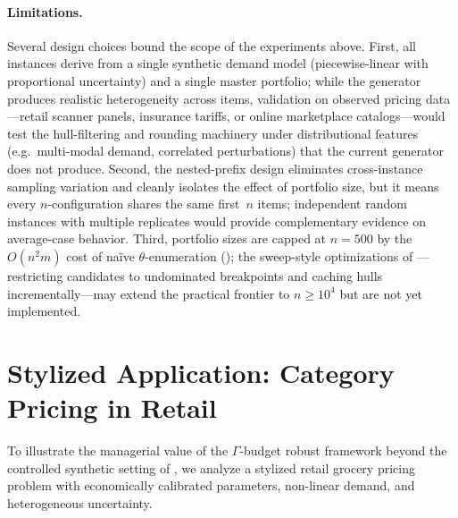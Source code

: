 \documentclass[11pt, a4paper]{article}
\theoremstyle{plain}
\theoremstyle{definition}
\theoremstyle{remark}
\begin{document}
\paragraph{Limitations.}
Several design choices bound the scope of the experiments above.
First, all instances derive from a single synthetic demand model (piecewise-linear with
proportional uncertainty) and a single master portfolio; while the generator produces
realistic heterogeneity across items, validation on observed pricing data---retail scanner
panels, insurance tariffs, or online marketplace catalogs---would test the hull-filtering
and rounding machinery under distributional features (e.g.\ multi-modal demand, correlated
perturbations) that the current generator does not produce.
Second, the nested-prefix design eliminates cross-instance sampling variation and cleanly
isolates the effect of portfolio size, but it means every $n$-configuration shares the same
first~$n$ items; independent random instances with multiple replicates would provide
complementary evidence on average-case behavior.
Third, portfolio sizes are capped at $n=500$ by the $O(n^2 m)$ cost of na\"ive
$\theta$-enumeration (); the sweep-style optimizations
of ---restricting candidates to undominated breakpoints and caching
hulls incrementally---may extend the practical frontier to $n\ge 10^4$ but
are not yet implemented.
\section{Stylized Application: Category Pricing in Retail}\label{sec:case_study}

To illustrate the managerial value of the $\Gamma$-budget robust framework beyond the
controlled synthetic setting of , we analyze a stylized retail grocery
pricing problem with economically calibrated parameters, non-linear demand, and
heterogeneous uncertainty.
\end{document}
